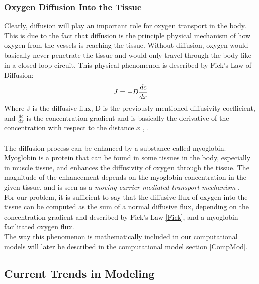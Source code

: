 \subsubsection*{Oxygen Diffusion Into the Tissue}
\label{Diffusion}

Clearly, diffusion will play an important role for oxygen transport in the body. This is due to the fact that diffusion is the principle physical mechanism of how oxygen from the vessels is reaching the tissue. Without diffusion, oxygen would basically never penetrate the tissue and would only travel through the body like in a closed loop circuit. This physical phenomenon is described by Fick's Law of Diffusion:
\begin{equation}
\\J = - D \frac{dc}{dx}
\label{Fick}
\end{equation}
Where J is the diffusive flux, D is the previously mentioned diffusivity coefficient, and $\frac{dc}{dx}$ is the concentration gradient and is basically the derivative of the concentration with respect to the distance $x$ \cite{lee2017accounting}, \cite{pittman2011regulation}.\\
\\The diffusion process can be enhanced by a substance called myoglobin. Myoglobin is a protein that can be found in some tissues in the body, especially in muscle tissue, and enhances the diffusivity of oxygen through the tissue. The magnitude of the enhancement depends on the myoglobin concentration in the given tissue, and is seen as a \emph{moving-carrier-mediated transport mechanism} \cite{wittenberg1970myoglobin}.
\\For our problem, it is sufficient to say that the diffusive flux of oxygen into the tissue can be computed as the sum of a normal diffusive flux, depending on the concentration gradient and described by Fick's Law \ref{Fick}, and a myoglobin facilitated oxygen flux.
\\The way this phenomenon is mathematically included in our computational models will later be described in the computational model section \ref{CompMod}.

\newpage
\subsection{Current Trends in Modeling}

